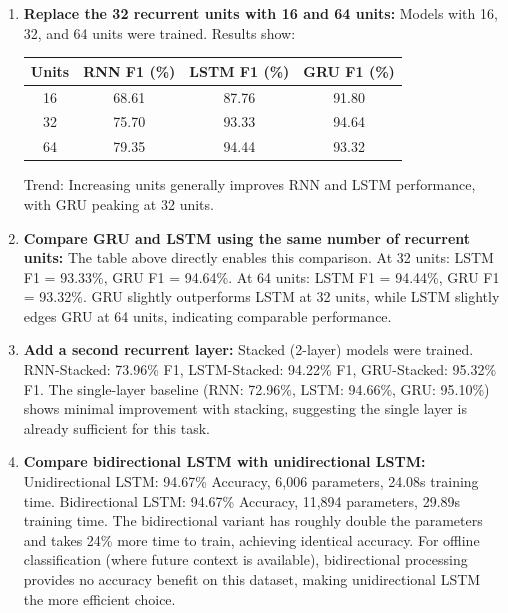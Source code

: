 \documentclass[10pt]{article}
\begin{document}
\begin{enumerate}
\item \textbf{Replace the 32 recurrent units with 16 and 64 units:}
Models with 16, 32, and 64 units were trained. Results show:
\begin{center}
\begin{tabular}{|c|c|c|c|}
\hline
\textbf{Units} & \textbf{RNN F1 (\%)} & \textbf{LSTM F1 (\%)} & \textbf{GRU F1 (\%)}\\
\hline
16 & 68.61 & 87.76 & 91.80\\
32 & 75.70 & 93.33 & 94.64\\
64 & 79.35 & 94.44 & 93.32\\
\hline
\end{tabular}
\end{center}
Trend: Increasing units generally improves RNN and LSTM performance, with GRU peaking at 32 units.

\item \textbf{Compare GRU and LSTM using the same number of recurrent units:}
The table above directly enables this comparison. At 32 units: LSTM F1 = 93.33\%, GRU F1 = 94.64\%. 
At 64 units: LSTM F1 = 94.44\%, GRU F1 = 93.32\%. GRU slightly outperforms LSTM at 32 units, while 
LSTM slightly edges GRU at 64 units, indicating comparable performance.

\item \textbf{Add a second recurrent layer:}
Stacked (2-layer) models were trained. RNN-Stacked: 73.96\% F1, LSTM-Stacked: 94.22\% F1, GRU-Stacked: 
95.32\% F1. The single-layer baseline (RNN: 72.96\%, LSTM: 94.66\%, GRU: 95.10\%) shows minimal 
improvement with stacking, suggesting the single layer is already sufficient for this task.

\item \textbf{Compare bidirectional LSTM with unidirectional LSTM:}
Unidirectional LSTM: 94.67\% Accuracy, 6,006 parameters, 24.08s training time. 
Bidirectional LSTM: 94.67\% Accuracy, 11,894 parameters, 29.89s training time. 
The bidirectional variant has roughly double the parameters and takes 24\% more time to train, achieving 
identical accuracy. For offline classification (where future context is available), bidirectional processing 
provides no accuracy benefit on this dataset, making unidirectional LSTM the more efficient choice.


\end{enumerate}
\end{document}
